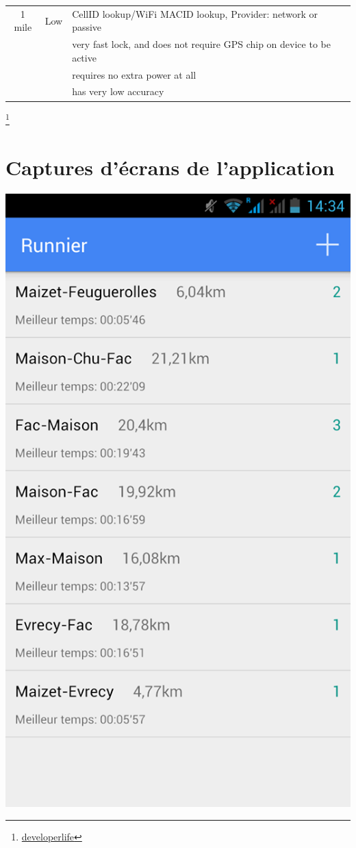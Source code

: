 \begin{appendices}
\begin{center}
\begin{tabular}{| c | c | l | }
    1 mile & Low & CellID lookup/WiFi MACID lookup, Provider: network or passive \\
     && very fast lock, and does not require GPS chip on device to be active \\
	 && requires no extra power at all \\ 
     && has very low accuracy \\
     \hline
   \end{tabular}
 \end{center}
	 	
		

		

		

\footnote{\href{http://developerlife.com/tutorials/?p=1375}{developerlife}}

\chapter{Captures d'écrans de l'application}
\label{Annexe3}
\begin{multicols}{3}
\begin{img}
  \includegraphics[scale=0.3]{img/home.jpg}

\end{img}
\end{multicols}
\end{appendices}
